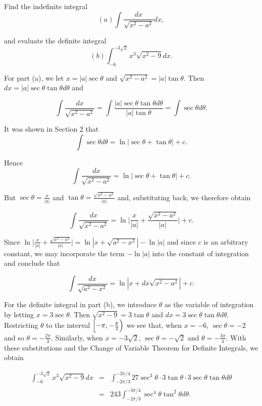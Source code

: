 \begin{example}
Find the indefinite integral
$$
(a)\int  \frac{dx}{\sqrt{x^2 - a^2}} dx ,
$$

\noindent and evaluate the definite integral
$$
(b) \int^{-3\sqrt 2}_{-6} x^{3} \sqrt{x^2 - 9}dx.
$$

For part (a), we let $x = |a| \sec \theta$ and $\sqrt{x^2 - a^2} = |a| \tan \theta$. Then $dx = |a| \sec \theta \tan\theta d\theta$ and

$$
\int \frac{dx}{\sqrt{x^2 - a^2}} = \int \frac{|a| \sec \theta \tan \theta d\theta}{|a| \tan \theta} = \int \sec \theta d\theta.
$$

\noindent It was shown in Section 2 that
$$
\int  \sec \theta d\theta = \ln |\sec \theta + \tan \theta | + c .
$$ 

\noindent Hence         
$$
\int \frac{dx}{\sqrt{x^2 - a^2}}  = \ln |\sec \theta + \tan \theta | + c.
$$


\noindent But $\sec \theta = \frac{x}{|a|}$ and $\tan \theta = \frac{\sqrt{x^2 - a^2}}{|a|}$ and, substituting back, we therefore obtain

$$
\int \frac{dx}{\sqrt{x^2 - a^2}} 
= \ln \Big| \frac{x}{|a|} + \frac{\sqrt{x^2 - a^2}}{|a|} \Big| + c.
$$

\noindent Since $\ln \Big| \frac{x}{|a|} + \frac{\sqrt{x^2 - a^2}}{|a|} \Big|  
= \ln | x + \sqrt{a^2 - x^2} | - \ln |a|$ and since $c$ is an arbitrary constant, 
we may incorporate the term $-\ln |a|$ into the constant of integration and conclude that

$$
\int  \frac{dx}{\sqrt{a^2 - x^2}} = \ln | x + dx \sqrt{x^2 - a^2} | + c.
$$
\end{example}

For the definite integral in part (b), we introduce $\theta$ as the variable of integration by letting $x = 3 \sec \theta$. Then $\sqrt{x^2 - 9} = 3 \tan \theta$ and $dx = 3 \sec \theta \tan \theta d\theta$. Restricting $\theta$ to the interval $\Bigl[-\pi, - \frac{\pi}{2}\Bigr )$ we see that, when $x = - 6$, 
$\sec \theta = - 2$ and so $\theta = - \frac{2\pi}{3}$. Similarly, when 
$x = - 3\sqrt 2$, $\sec \theta = -\sqrt 2$ and $\theta = - \frac{3\pi}{4}$. With these substitutions and the Change of Variable Theorem for Definite Integrals, we obtain


\begin{eqnarray*} 
\int^{-3 \sqrt2}_{-6} x^{3} \sqrt{x^2 - 9} dx
&=& \int^{-3\pi/4}_{-2\pi/3} 27 \sec^{3}\theta \cdot 3 \tan \theta \cdot 3 \sec \theta \tan \theta d \theta\\   
&=& 243 \int^{-3\pi/4}_{-2\pi/3} \sec^{4} \theta \tan^{2} \theta d\theta. 
\end{eqnarray*} 

